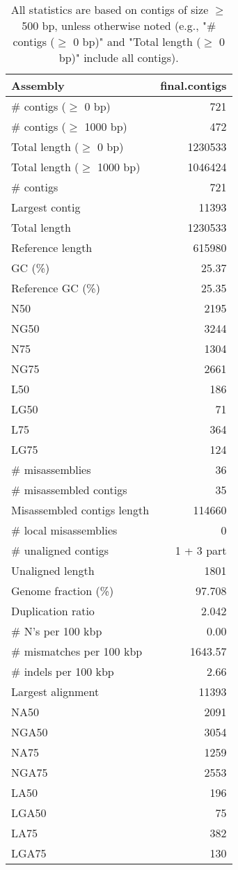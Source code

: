 \documentclass[12pt,a4paper]{article}
\begin{document}
\begin{table}[ht]
\begin{center}
\caption{All statistics are based on contigs of size $\geq$ 500 bp, unless otherwise noted (e.g., "\# contigs ($\geq$ 0 bp)" and "Total length ($\geq$ 0 bp)" include all contigs).}
\begin{tabular}{|l*{1}{|r}|}
\hline
Assembly & final.contigs \\ \hline
\# contigs ($\geq$ 0 bp) & 721 \\ \hline
\# contigs ($\geq$ 1000 bp) & 472 \\ \hline
Total length ($\geq$ 0 bp) & 1230533 \\ \hline
Total length ($\geq$ 1000 bp) & 1046424 \\ \hline
\# contigs & 721 \\ \hline
Largest contig & 11393 \\ \hline
Total length & 1230533 \\ \hline
Reference length & 615980 \\ \hline
GC (\%) & 25.37 \\ \hline
Reference GC (\%) & 25.35 \\ \hline
N50 & 2195 \\ \hline
NG50 & 3244 \\ \hline
N75 & 1304 \\ \hline
NG75 & 2661 \\ \hline
L50 & 186 \\ \hline
LG50 & 71 \\ \hline
L75 & 364 \\ \hline
LG75 & 124 \\ \hline
\# misassemblies & 36 \\ \hline
\# misassembled contigs & 35 \\ \hline
Misassembled contigs length & 114660 \\ \hline
\# local misassemblies & 0 \\ \hline
\# unaligned contigs & 1 + 3 part \\ \hline
Unaligned length & 1801 \\ \hline
Genome fraction (\%) & 97.708 \\ \hline
Duplication ratio & 2.042 \\ \hline
\# N's per 100 kbp & 0.00 \\ \hline
\# mismatches per 100 kbp & 1643.57 \\ \hline
\# indels per 100 kbp & 2.66 \\ \hline
Largest alignment & 11393 \\ \hline
NA50 & 2091 \\ \hline
NGA50 & 3054 \\ \hline
NA75 & 1259 \\ \hline
NGA75 & 2553 \\ \hline
LA50 & 196 \\ \hline
LGA50 & 75 \\ \hline
LA75 & 382 \\ \hline
LGA75 & 130 \\ \hline
\end{tabular}
\end{center}
\end{table}
\end{document}
